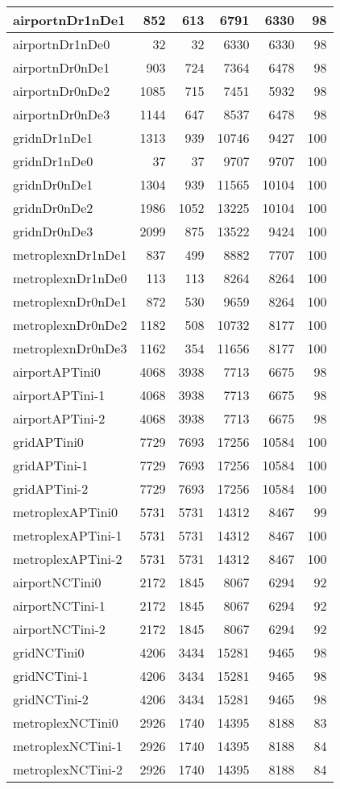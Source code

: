 \begin{longtable}{|l|r|r|r|r|r|}
\endlastfoot
airportnDr1nDe1 & 852 & 613 & 6791 & 6330 & 98 \\ \hline
airportnDr1nDe0 & 32 & 32 & 6330 & 6330 & 98 \\ \hline
airportnDr0nDe1 & 903 & 724 & 7364 & 6478 & 98 \\ \hline
airportnDr0nDe2 & 1085 & 715 & 7451 & 5932 & 98 \\ \hline
airportnDr0nDe3 & 1144 & 647 & 8537 & 6478 & 98 \\ \hline
gridnDr1nDe1 & 1313 & 939 & 10746 & 9427 & 100 \\ \hline
gridnDr1nDe0 & 37 & 37 & 9707 & 9707 & 100 \\ \hline
gridnDr0nDe1 & 1304 & 939 & 11565 & 10104 & 100 \\ \hline
gridnDr0nDe2 & 1986 & 1052 & 13225 & 10104 & 100 \\ \hline
gridnDr0nDe3 & 2099 & 875 & 13522 & 9424 & 100 \\ \hline
metroplexnDr1nDe1 & 837 & 499 & 8882 & 7707 & 100 \\ \hline
metroplexnDr1nDe0 & 113 & 113 & 8264 & 8264 & 100 \\ \hline
metroplexnDr0nDe1 & 872 & 530 & 9659 & 8264 & 100 \\ \hline
metroplexnDr0nDe2 & 1182 & 508 & 10732 & 8177 & 100 \\ \hline
metroplexnDr0nDe3 & 1162 & 354 & 11656 & 8177 & 100 \\ \hline
airportAPTini0 & 4068 & 3938 & 7713 & 6675 & 98 \\ \hline
airportAPTini-1 & 4068 & 3938 & 7713 & 6675 & 98 \\ \hline
airportAPTini-2 & 4068 & 3938 & 7713 & 6675 & 98 \\ \hline
gridAPTini0 & 7729 & 7693 & 17256 & 10584 & 100 \\ \hline
gridAPTini-1 & 7729 & 7693 & 17256 & 10584 & 100 \\ \hline
gridAPTini-2 & 7729 & 7693 & 17256 & 10584 & 100 \\ \hline
metroplexAPTini0 & 5731 & 5731 & 14312 & 8467 & 99 \\ \hline
metroplexAPTini-1 & 5731 & 5731 & 14312 & 8467 & 100 \\ \hline
metroplexAPTini-2 & 5731 & 5731 & 14312 & 8467 & 100 \\ \hline
airportNCTini0 & 2172 & 1845 & 8067 & 6294 & 92 \\ \hline
airportNCTini-1 & 2172 & 1845 & 8067 & 6294 & 92 \\ \hline
airportNCTini-2 & 2172 & 1845 & 8067 & 6294 & 92 \\ \hline
gridNCTini0 & 4206 & 3434 & 15281 & 9465 & 98 \\ \hline
gridNCTini-1 & 4206 & 3434 & 15281 & 9465 & 98 \\ \hline
gridNCTini-2 & 4206 & 3434 & 15281 & 9465 & 98 \\ \hline
metroplexNCTini0 & 2926 & 1740 & 14395 & 8188 & 83 \\ \hline
metroplexNCTini-1 & 2926 & 1740 & 14395 & 8188 & 84 \\ \hline
metroplexNCTini-2 & 2926 & 1740 & 14395 & 8188 & 84 \\ \hline
\end{longtable}
